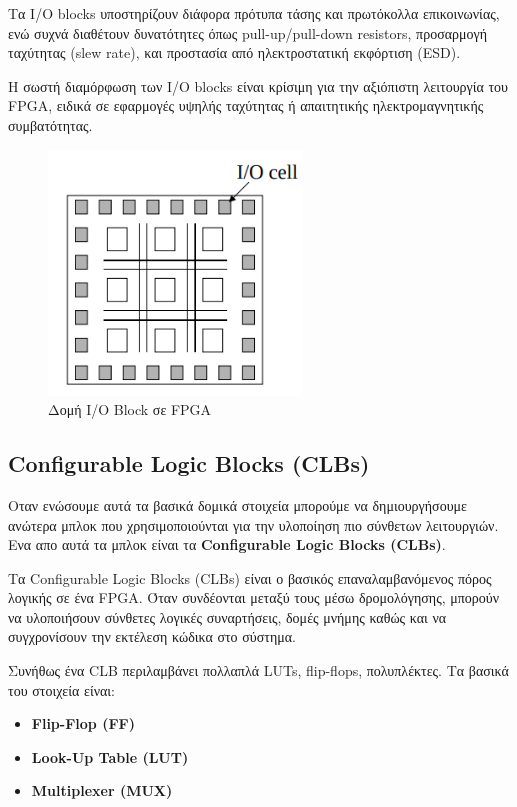 Τα I/O blocks υποστηρίζουν διάφορα πρότυπα τάσης και πρωτόκολλα επικοινωνίας, ενώ συχνά διαθέτουν δυνατότητες όπως pull-up/pull-down resistors, προσαρμογή ταχύτητας (slew rate), και προστασία από ηλεκτροστατική εκφόρτιση (ESD).

Η σωστή διαμόρφωση των I/O blocks είναι κρίσιμη για την αξιόπιστη λειτουργία του FPGA, ειδικά σε εφαρμογές υψηλής ταχύτητας ή απαιτητικής ηλεκτρομαγνητικής συμβατότητας.

\begin{figure}[h!]
  \centering
  \includegraphics[width=0.6\textwidth]{figures/chapter3/io_block.png}
  \caption{Δομή I/O Block σε FPGA}
  \label{fig:io_block}
\end{figure}

\subsection{Configurable Logic Blocks (CLBs)}
Οταν ενώσουμε αυτά τα βασικά δομικά στοιχεία μπορούμε να δημιουργήσουμε ανώτερα μπλοκ που χρησιμοποιούνται για την υλοποίηση πιο σύνθετων λειτουργιών.
Ενα απο αυτά τα μπλοκ είναι τα \textbf{Configurable Logic Blocks (CLBs)}.

Τα Configurable Logic Blocks (CLBs) είναι ο βασικός επαναλαμβανόμενος πόρος λογικής σε ένα FPGA. Όταν συνδέονται μεταξύ τους μέσω δρομολόγησης, μπορούν να υλοποιήσουν
σύνθετες λογικές συναρτήσεις, δομές μνήμης καθώς και να συγχρονίσουν την εκτέλεση κώδικα στο σύστημα.

Συνήθως ένα CLB περιλαμβάνει πολλαπλά LUTs, flip-flops, πολυπλέκτες. Τα βασικά του στοιχεία είναι:
\begin{itemize}
  \item \textbf{Flip-Flop (FF)}
  \item \textbf{Look-Up Table (LUT)}
  \item \textbf{Multiplexer (MUX)}
\end{itemize}

